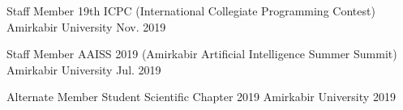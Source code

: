 

\begin{cventries}

    \cventry
    {Staff Member} %
    {19th ICPC (International Collegiate Programming Contest)} %
    {Amirkabir University} %
    {Nov. 2019} %
    {
        \begin{cvitems} %
        \end{cvitems}
    }

    \cventry
    {Staff Member} %
    {AAISS 2019 (Amirkabir Artificial Intelligence Summer Summit)} %
    {Amirkabir University} %
    {Jul. 2019} %
    {
        \begin{cvitems} %
        \end{cvitems}
    }


    \cventry
    {Alternate Member} %
    {Student Scientific Chapter 2019} %
    {Amirkabir University} %
    {2019} %
    {
        \begin{cvitems} %
        \end{cvitems}
    }

\end{cventries}